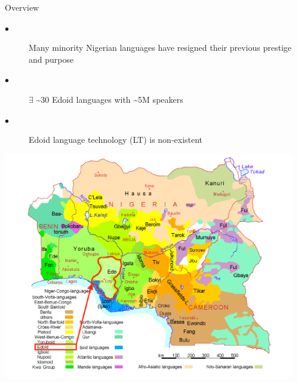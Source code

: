 \documentclass[final]{beamer}
\newlength{\sepwid}
\newlength{\onecolwid}
\begin{document}
\begin{frame}[t] %

\begin{columns}[t] %

\begin{column}{\sepwid}\end{column} %

\begin{column}{\onecolwid} %


\begin{block}{Overview}
\begin{description}
  \item[$\bullet$] Many minority Nigerian languages have resigned their previous prestige and purpose 
  \item[$\bullet$] $\exists$ \textasciitilde{30} Edoid languages with \textasciitilde{5M} speakers
  \item[$\bullet$] Edoid language technology (LT) is non-existent
\end{description}

\vspace{10mm}


\end{block}

\vspace{5mm}

\begin{block}{}

\vspace{-15mm}

\begin{center}
 \includegraphics[trim = 25mm 0mm 5mm 3mm, clip, width=1.2\textwidth]{figures/Edoid.pdf}
\end{center}


\end{block}
\end{column}
\end{columns}
\end{frame}
\end{document}
